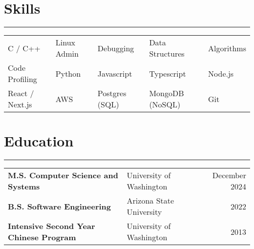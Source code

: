 \documentclass[letterpaper,11pt]{article}
\begin{document}
\section*{Skills}
\hrule
\begin{tabularx}{\linewidth}{@{}YYYYY@{}}
  C / C++         & Linux Admin & Debugging      & Data Structures & Algorithms \\
  Code Profiling  & Python      & Javascript     & Typescript      & Node.js    \\
  React / Next.js & AWS         & Postgres (SQL) & MongoDB (NoSQL) & Git        \\
\end{tabularx}

\vspace{-5px}
\section*{Education}
\hrule
\begin{tabularx}{\linewidth}{@{}XXr@{}}
  \textbf{M.S. Computer Science and Systems}     & University of Washington & December 2024 \\
  \textbf{B.S. Software Engineering}             & Arizona State University & 2022          \\
  \textbf{Intensive Second Year Chinese Program} & University of Washington & 2013          \\
\end{tabularx}
\end{document}
